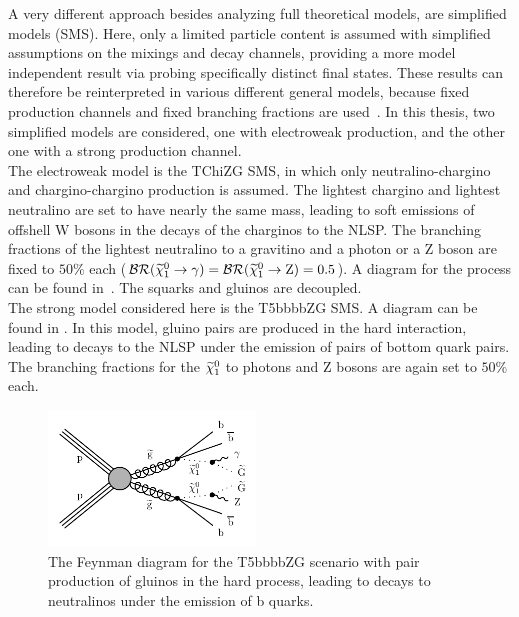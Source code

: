 A very different approach besides analyzing full theoretical models, are simplified models (SMS)\cite{SMS}. Here, only a limited particle content is assumed with simplified assumptions on the mixings and decay channels, providing a more model independent result via probing specifically distinct final states. These results can therefore be reinterpreted in various different general models, because fixed production channels and fixed branching fractions are used~\cite{SMSReInt}. In this thesis, two simplified models are considered, one with electroweak production, and the other one with a strong production channel.\\
The electroweak model is the TChiZG SMS, in which only neutralino-chargino and chargino-chargino production is assumed. The lightest chargino and lightest neutralino are set to have nearly the same mass, leading to soft emissions of offshell W bosons in the decays of the charginos to the NLSP. The branching fractions of the lightest neutralino to a gravitino and a photon or a Z boson are fixed to $50\%$ each ($\mathcal{BR}(\widetilde{\chi}^{0}_{1}\to\gamma)=\mathcal{BR}(\widetilde{\chi}^{0}_{1}\to\mathrm{Z})=0.5$). A diagram for the process can be found in~. The squarks and gluinos are decoupled.\\
The strong model considered here is the T5bbbbZG SMS. A diagram can be found in . In this model, gluino pairs are produced in the hard interaction, leading to decays to the NLSP under the emission of pairs of bottom quark pairs. The branching fractions for the $\widetilde{\chi}^{0}_{1}$ to photons and Z bosons are again set to $50\%$ each.

\begin{figure}[hbtp]
 \centering
 \includegraphics[width=0.49\textwidth]{figures/signal/T5bbbbZG-crop}
 \caption{The Feynman diagram for the T5bbbbZG scenario with pair production of gluinos in the hard process, leading to decays to neutralinos under the emission of b quarks.}
 \label{fig:strongSMS}
\end{figure}


